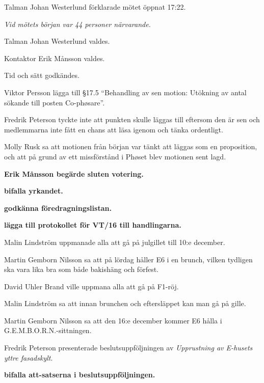\documentclass[10pt]{article}
\def\mo{Johan Westerlund}
\def\ms{Erik Månsson}
\begin{document}
\begin{paragrafer}
Talman {\mo} förklarade mötet öppnat 17:22.

\emph{Vid mötets början var 44 personer närvarande.}

Talman {\mo} valdes.

Kontaktor {\ms} valdes.

Tid och sätt godkändes.

\valavj

\emph{\ingaadj}

Viktor Persson \ypa lägga till \S17.5 ``Behandling av sen motion: Utökning av antal sökande till posten Co-phøsare''.

Fredrik Peterson tyckte inte att punkten skulle läggas till eftersom den är sen och medlemmarna inte fått en chans att läsa igenom och tänka ordentligt.

Molly Rusk sa att motionen från början var tänkt att läggas som en proposition, och att på grund av ett missförstånd i Phøset blev motionen sent lagd.

\textbf{Erik Månsson begärde sluten votering.}

\textbf{\Mba bifalla yrkandet.}

\textbf{\Mba godkänna föredragningslistan.}

\textbf{\Mba lägga till protokollet för VT/16 till handlingarna.}

Malin Lindström uppmanade alla att gå på julgillet till 10:e december.

Martin Gemborn Nilsson sa att på lördag håller E6 i en brunch, vilken tydligen ska vara lika bra som både bakishäng och förfest.

David Uhler Brand ville uppmana alla att gå på F1-röj.

Malin Lindström sa att innan brunchen och eftersläppet kan man gå på gille.

Martin Gemborn Nilsson sa att den 16:e december kommer E6 hålla i G.E.M.B.O.R.N.-sittningen.

Fredrik Peterson presenterade beslutsuppföljningen av \emph{Upprustning av E-husets yttre fasadskylt}.

\textbf{\Mba bifalla att-satserna i beslutsuppföljningen.}


\end{paragrafer}
\end{document}
